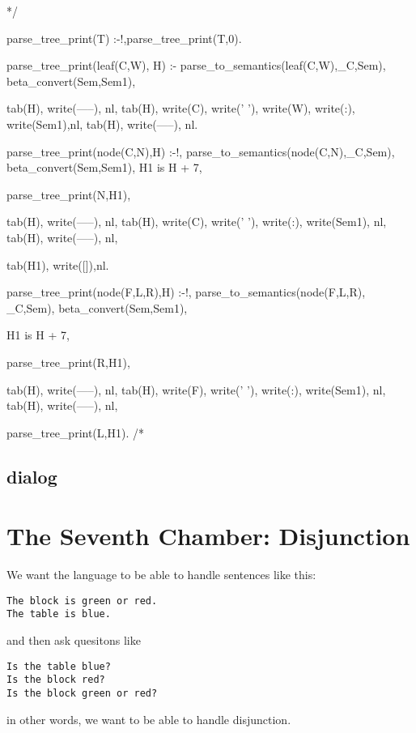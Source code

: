 \documentclass{book}[9pt]
\newenvironment{code}%
{\small \verbatim}%
{\endverbatim \large}
\begin{document}
\begin{code}
*/

parse_tree_print(T) :-!,parse_tree_print(T,0).

parse_tree_print(leaf(C,W), H) :-
        parse_to_semantics(leaf(C,W),_C,Sem), beta_convert(Sem,Sem1),
        
        tab(H), write(-----),    nl,
        tab(H), write(C), write(' '), write(W), write(:), write(Sem1),nl,
        tab(H), write(-----),    nl.
        

parse_tree_print(node(C,N),H) :-!,
        parse_to_semantics(node(C,N),_C,Sem), beta_convert(Sem,Sem1),
        H1 is H + 7,
        
        parse_tree_print(N,H1),
        
        tab(H), write(-----),    nl,
        tab(H), write(C), write(' '), write(:), write(Sem1), nl,
        tab(H), write(-----),  nl,
        
        tab(H1), write([]),nl.

parse_tree_print(node(F,L,R),H) :-!,
        parse_to_semantics(node(F,L,R), _C,Sem), beta_convert(Sem,Sem1),
        
        H1 is H + 7,
        
        parse_tree_print(R,H1),
        
        tab(H), write(-----),    nl,
        tab(H), write(F), write(' '), write(:), write(Sem1), nl,
        tab(H), write(-----),    nl,
        
        parse_tree_print(L,H1).
/*
\end{code}

\section{dialog}

\chapter{The Seventh Chamber: Disjunction}


We want the language to be able to handle sentences like this:
\begin{verbatim}
The block is green or red.
The table is blue.
\end{verbatim}
\noindent and then ask quesitons like
\begin{verbatim}
Is the table blue?
Is the block red?
Is the block green or red?
\end{verbatim}
\noindent in other words, we want to be able to handle disjunction. 
\end{document}
